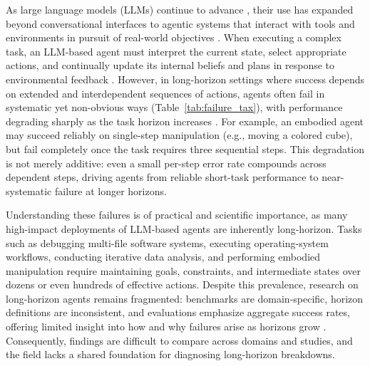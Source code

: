 \documentclass[11pt]{article}
\begin{document}
As large language models (LLMs) continue to advance \citep{deepseekai2025deepseekv3technicalreport, openai-gpt5, anthropic-claude4-sonnet, geminiteam2025geminifamilyhighlycapable, yang2025qwen3technicalreport}, their use has expanded beyond conversational interfaces to agentic systems that interact with tools and environments in pursuit of real-world objectives \citep{team2025kimi, xi2025rise}. When executing a complex task, an LLM-based agent must interpret the current state, select appropriate actions, and continually update its internal beliefs and plans in response to environmental feedback \citep{zhou2024archertraininglanguagemodel}.
However, in long-horizon settings where success depends on extended and interdependent sequences of actions, agents often fail in systematic yet non-obvious ways (Table~\ref{tab:failure_tax}), with performance degrading sharply as the task horizon increases \citep{yang2025lohovla, chen2025reinforcement, xi2025agentgym}. For example, an embodied agent may succeed reliably on single-step manipulation (e.g., moving a colored cube), but fail completely once the task requires three sequential steps. This degradation is not merely additive: even a small per-step error rate compounds across dependent steps, driving agents from reliable short-task performance to near-systematic failure at longer horizons.

Understanding these failures is of practical and scientific importance, as many high-impact deployments of LLM-based agents are inherently long-horizon. Tasks such as debugging multi-file software systems, executing operating-system workflows, conducting iterative data analysis, and performing embodied manipulation require maintaining goals, constraints, and intermediate states over dozens or even hundreds of effective actions.
Despite this prevalence, research on long-horizon agents remains fragmented: benchmarks are domain-specific, horizon definitions are inconsistent, and evaluations emphasize aggregate success rates, offering limited insight into how and why failures arise as horizons grow \citep{liu2023agentbench, trivedi2024appworld, kapoor2025holistic, zhang2025mirage, chen2024can}. Consequently, findings are difficult to compare across domains and studies, and the field lacks a shared foundation for diagnosing long-horizon breakdowns.


\end{document}
